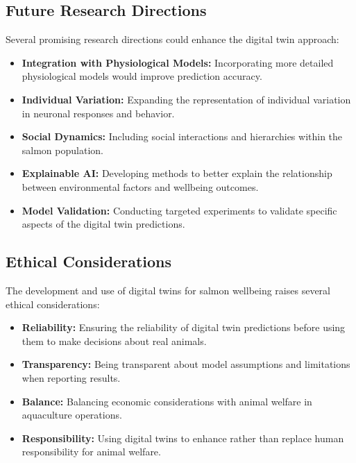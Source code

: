 \documentclass[11pt,a4paper]{article}
\begin{document}
\subsection{Future Research Directions}
Several promising research directions could enhance the digital twin approach:

\begin{itemize}
    \item \textbf{Integration with Physiological Models:} Incorporating more detailed physiological models would improve prediction accuracy.
    
    \item \textbf{Individual Variation:} Expanding the representation of individual variation in neuronal responses and behavior.
    
    \item \textbf{Social Dynamics:} Including social interactions and hierarchies within the salmon population.
    
    \item \textbf{Explainable AI:} Developing methods to better explain the relationship between environmental factors and wellbeing outcomes.
    
    \item \textbf{Model Validation:} Conducting targeted experiments to validate specific aspects of the digital twin predictions.
\end{itemize}

\subsection{Ethical Considerations}
The development and use of digital twins for salmon wellbeing raises several ethical considerations:

\begin{itemize}
    \item \textbf{Reliability:} Ensuring the reliability of digital twin predictions before using them to make decisions about real animals.
    
    \item \textbf{Transparency:} Being transparent about model assumptions and limitations when reporting results.
    
    \item \textbf{Balance:} Balancing economic considerations with animal welfare in aquaculture operations.
    
    \item \textbf{Responsibility:} Using digital twins to enhance rather than replace human responsibility for animal welfare.
\end{itemize}
\end{document}
